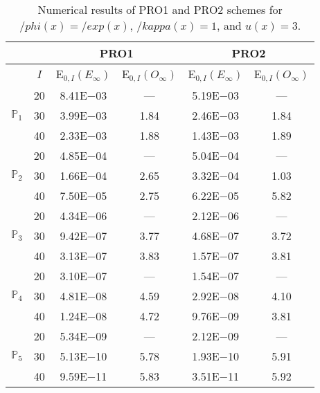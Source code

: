 \begin{table}[H]
\caption{Numerical results of PRO1 and PRO2 schemes for $/phi(x)=/exp(x)$, $/kappa(x)=1$, and $u(x)=3$.}
\setlength{\tabcolsep}{5pt}
\centering
\begin{tabular}{@{}l c c c c c@{}}
\toprule
 &  & \multicolumn{2}{c}{PRO1} & \multicolumn{2}{c}{PRO2}\\
\midrule
 & $I$ & E$_{0,I}(E_{\infty})$ & E$_{0,I}(O_{\infty})$ & E$_{0,I}(E_{\infty})$ & E$_{0,I}(O_{\infty})$\\
\midrule
\multirow{3}{*}{$\mathbb{P}_{1}$}
 & 20 & 8.41E$-$03 & --- & 5.19E$-$03 & ---\\
 & 30 & 3.99E$-$03 & 1.84 & 2.46E$-$03 & 1.84 \\
 & 40 & 2.33E$-$03 & 1.88 & 1.43E$-$03 & 1.89 \\
\midrule
\multirow{3}{*}{$\mathbb{P}_{2}$}
 & 20 & 4.85E$-$04 & --- & 5.04E$-$04 & ---\\
 & 30 & 1.66E$-$04 & 2.65 & 3.32E$-$04 & 1.03 \\
 & 40 & 7.50E$-$05 & 2.75 & 6.22E$-$05 & 5.82 \\
\midrule
\multirow{3}{*}{$\mathbb{P}_{3}$}
 & 20 & 4.34E$-$06 & --- & 2.12E$-$06 & ---\\
 & 30 & 9.42E$-$07 & 3.77 & 4.68E$-$07 & 3.72 \\
 & 40 & 3.13E$-$07 & 3.83 & 1.57E$-$07 & 3.81 \\
\midrule
\multirow{3}{*}{$\mathbb{P}_{4}$}
 & 20 & 3.10E$-$07 & --- & 1.54E$-$07 & ---\\
 & 30 & 4.81E$-$08 & 4.59 & 2.92E$-$08 & 4.10 \\
 & 40 & 1.24E$-$08 & 4.72 & 9.76E$-$09 & 3.81 \\
\midrule
\multirow{3}{*}{$\mathbb{P}_{5}$}
 & 20 & 5.34E$-$09 & --- & 2.12E$-$09 & ---\\
 & 30 & 5.13E$-$10 & 5.78 & 1.93E$-$10 & 5.91 \\
 & 40 & 9.59E$-$11 & 5.83 & 3.51E$-$11 & 5.92 \\
\bottomrule
\end{tabular}
\label{Table:PRO:Test3}
\end{table}
